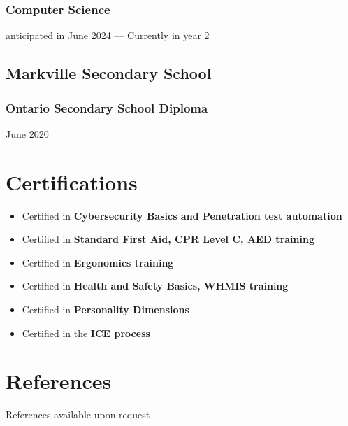 \documentclass{article}
\begin{document}
\subsubsection{Computer Science} anticipated in June 2024 --- Currently in year 2
\subsection{Markville Secondary School}
\subsubsection{Ontario Secondary School Diploma} June 2020

\section{Certifications}
\begin{itemize}
    \item Certified in \textbf{Cybersecurity Basics and Penetration test automation}
    \item Certified in \textbf{Standard First Aid, CPR Level C, AED training}
    \item Certified in \textbf{Ergonomics training}
    \item Certified in \textbf{Health and Safety Basics, WHMIS training}
    \item Certified in \textbf{Personality Dimensions}
    \item Certified in the \textbf{ICE process}
\end{itemize}

\section{References}
References available upon request
\end{document}
